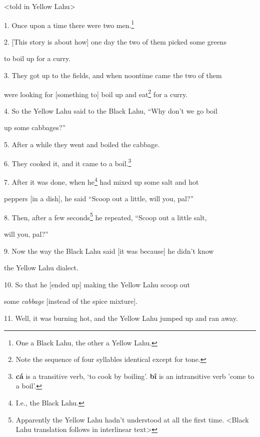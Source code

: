 \setcounter{footnote}{0}

<told in Yellow Lahu>

1. Once upon a time there were two men.\footnote{One a Black Lahu, the other a Yellow Lahu.}

2. [This story is about how] one day the two of them picked some greens

to boil up for a curry.

3. They got up to the fields, and when noontime came the two of them

were looking for [something to] boil up and eat\footnote{Note the sequence of four syllables identical except for tone.} for a curry.

4. So the Yellow Lahu said to the Black Lahu, ``Why don't we go boil

up some cabbages?''

5. After a while they went and boiled the cabbage.

6. They cooked it, and it came to a boil.\footnote{\textbf{cá} is a transitive verb, `to cook by boiling'. \textbf{bî} is an intransitive verb 'come to a boil'.}

7. After it was done, when he\footnote{I.e., the Black Lahu.} had mixed up some salt and hot

peppers [in a dish], he said ``Scoop out a little, will you, pal?''

8. Then, after a few seconds\footnote{Apparently the Yellow Lahu hadn't understood at all the first time. <Black Lahu translation follows in interlinear text>} he repeated, ``Scoop out a little salt,

will you, pal?''

9. Now the way the Black Lahu said [it was because] he didn't know

the Yellow Lahu dialect.

10. So that he [ended up] making the Yellow Lahu scoop out

some \textit{cabbage }[instead of the spice mixture].

11. Well, it was burning hot, and the Yellow Lahu jumped up and ran away.

